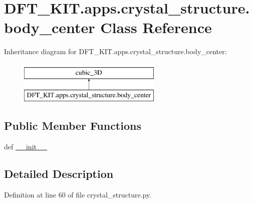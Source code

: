 \hypertarget{class_d_f_t___k_i_t_1_1apps_1_1crystal__structure_1_1body__center}{\section{D\+F\+T\+\_\+\+K\+I\+T.\+apps.\+crystal\+\_\+structure.\+body\+\_\+center Class Reference}
\label{class_d_f_t___k_i_t_1_1apps_1_1crystal__structure_1_1body__center}
}
Inheritance diagram for D\+F\+T\+\_\+\+K\+I\+T.\+apps.\+crystal\+\_\+structure.\+body\+\_\+center\+:\begin{figure}[H]
\begin{center}
\leavevmode
\includegraphics[height=2.000000cm]{class_d_f_t___k_i_t_1_1apps_1_1crystal__structure_1_1body__center}
\end{center}
\end{figure}
\subsection*{Public Member Functions}
\begin{DoxyCompactItemize}
\item 
def \hyperlink{class_d_f_t___k_i_t_1_1apps_1_1crystal__structure_1_1body__center_aace7b55a229068943fc34a22f89f8892}{\+\_\+\+\_\+init\+\_\+\+\_\+}
\end{DoxyCompactItemize}


\subsection{Detailed Description}


Definition at line 60 of file crystal\+\_\+structure.\+py.



